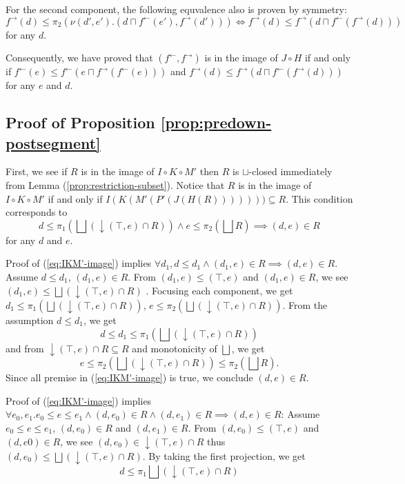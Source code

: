 \documentclass{llncs}
\newcommand{\ff}{{f^{\rightarrow}}}
\newcommand{\fb}{{f^{\leftarrow}}}
\newcommand{\join}{\sqcup}
\newcommand{\bigjoin}{\bigsqcup}
\newcommand{\meet}{\sqcap}
\newcommand{\comp}{\circ}
\begin{document}
For the second component, the following equvalence also is proven by symmetry:
\[
  \ff(d) \leq \pi_{2} (\nu (d',e').(d \meet \fb(e') , \ff(d'))) \iff \ff(d) \leq \ff(d \meet \fb (\ff(d)))
\] for any $d$.

Consequently, we have proved that $(\fb, \ff)$ is in the image of $J \comp H$ if and only if
$\fb(e) \leq \fb(e \meet \ff (\fb(e)))$ and $\ff(d) \leq \ff(d \meet \fb (\ff(d)))$ for any $e$ and $d$.

\subsection{Proof of Proposition \ref{prop:predown-postsegment}}
First, we see if $R$ is in the image of $I \comp K \comp M'$ then $R$ is $\join$-closed immediately from Lemma (\ref{prop:restriction-subset}).
Notice that $R$ is in the image of $I \comp K \comp M'$ if and only if $I(K(M'(P'(J(H(R))))))) \subseteq R$. This condition corresponds to
\begin{equation}\label{eq:IKM'-image}
  d \leq \pi_{1} (\bigjoin(\downarrow (\top , e) \cap R)) \land e \leq \pi_{2} (\bigjoin R) \implies (d, e) \in R
\end{equation}
for any $d$ and $e$.

Proof of (\ref{eq:IKM'-image}) implies $\forall d_{1} , d \leq d_{1} \land (d_{1} , e) \in R \implies (d , e) \in R$.
Assume $d \leq d_1$, $(d_1, e) \in R$. From $(d_{1} , e) \leq (\top , e)$ and $(d_{1} , e) \in R$, we see $(d_{1} , e) \leq \bigjoin (\downarrow (\top , e) \cap R)$ . Focusing each component, we get $d_{1} \leq \pi_{1} (\bigjoin (\downarrow (\top , e) \cap R))$, $e \leq \pi_{2} (\bigjoin (\downarrow (\top , e) \cap R))$. From the assumption $d \leq d_{1}$, we get
\[
  d \leq d_{1} \leq \pi_{1} (\bigjoin (\downarrow (\top , e) \cap R))
\] and from $\downarrow (\top , e) \cap R \subseteq R$ and monotonicity of $\bigjoin$, we get
\[
  e \leq  \pi_{2} (\bigjoin (\downarrow (\top , e) \cap R)) \leq \pi_{2} (\bigjoin R).
\] Since all premise in (\ref{eq:IKM'-image}) is true, we conclude $(d, e) \in R$.

Proof of (\ref{eq:IKM'-image}) implies $\forall e_{0}, e_{1}. e_{0} \leq e \leq e_{1} \land (d , e_{0}) \in R \land (d , e_{1}) \in R \implies (d , e) \in R$:
Assume $e_{0} \leq e \leq e_{1}$, $(d , e_{0}) \in R$ and $(d, e_{1}) \in R$.
From $(d , e_{0}) \leq (\top , e)$ and $(d, e{0}) \in R$, we see $(d , e_{0}) \in \downarrow (\top , e) \cap R$ thus $(d , e_{0}) \leq \bigjoin (\downarrow (\top , e) \cap R)$. By taking the first projection, we get
\[ d \leq \pi_{1} \bigjoin (\downarrow (\top , e) \cap R) \]
\end{document}
